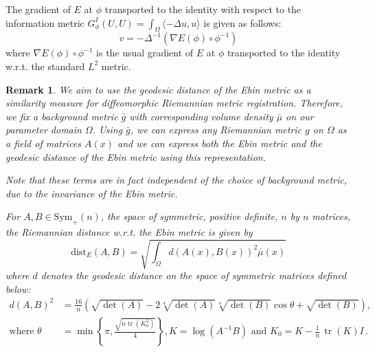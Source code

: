 \documentclass{article}
\theoremstyle{definition}
\theoremstyle{plain}
\newtheorem{remark}{Remark}
\begin{document}
The gradient of $E$ at $\phi$ transported to the identity with respect to the information metric $G^I_\phi(U,U)=\int_\Omega\langle-\Delta u,u\rangle$ is given as follows:
\begin{equation*}
    v=-\Delta^{-1}(\nabla E(\phi)\circ\phi^{-1})
\end{equation*}
where $\nabla E(\phi)\circ\phi^{-1}$ is the usual gradient of $E$ at $\phi$ transported to the identity w.r.t. the standard $L^2$ metric.

\begin{remark}
We aim to use the geodesic distance of the Ebin metric as a similarity measure for diffeomorphic Riemannian metric registration. Therefore, we fix a background metric $\bar g$ with corresponding volume density $\bar\mu$ on our parameter domain $\Omega$. Using $\bar g$, we can express any Riemannian metric $g$ on $\Omega$ as a field of matrices $A(x)$ and we can express both the Ebin metric and the geodesic distance of the Ebin metric using this representation.

Note that these terms are in fact independent of the choice of background metric, due to the invariance of the Ebin metric.

For $A,B\in\mathrm{Sym}_+(n)$, the space of symmetric, positive definite, $n$ by $n$ matrices, the Riemannian distance w.r.t. the Ebin metric is given by
\begin{equation*}
    \mathrm{dist}_E(A,B)=\sqrt{\int_{\Omega} d(A(x),B(x))^2 \bar \mu(x) }
\end{equation*}
where $d$ denotes the geodesic distance on the space of symmetric matrices defined below:
\begin{align*}
    d(A,B)^2 &=  \frac{16}{n}\left( \sqrt{\operatorname{det}(A)}  -2\sqrt[4]{\operatorname{det}(A)}\sqrt[4]{\operatorname{det}(B)}  \cos{\theta} 
+\sqrt{\operatorname{det}(B)}\right), \\
\text{where }\theta &=  \min\left\{\pi, \frac{\sqrt{n\operatorname{tr}(K_0^2)}}{4}\right\}, K=\operatorname{log}(A^{-1}B)\text{ and } K_0=K-\tfrac{1}{n} \, \operatorname{tr}(K)I\,.
\end{align*}
\end{remark}
\end{document}
